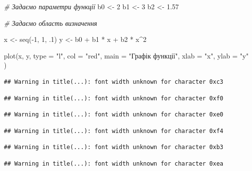 \documentclass[
]{book}
\newenvironment{Shaded}{\begin{snugshade}}{\end{snugshade}}
\newcommand{\AttributeTok}[1]{\textcolor[rgb]{0.77,0.63,0.00}{#1}}
\newcommand{\CommentTok}[1]{\textcolor[rgb]{0.56,0.35,0.01}{\textit{#1}}}
\newcommand{\DecValTok}[1]{\textcolor[rgb]{0.00,0.00,0.81}{#1}}
\newcommand{\FloatTok}[1]{\textcolor[rgb]{0.00,0.00,0.81}{#1}}
\newcommand{\FunctionTok}[1]{\textcolor[rgb]{0.00,0.00,0.00}{#1}}
\newcommand{\NormalTok}[1]{#1}
\newcommand{\OtherTok}[1]{\textcolor[rgb]{0.56,0.35,0.01}{#1}}
\newcommand{\SpecialCharTok}[1]{\textcolor[rgb]{0.00,0.00,0.00}{#1}}
\newcommand{\StringTok}[1]{\textcolor[rgb]{0.31,0.60,0.02}{#1}}
\begin{document}
\begin{Shaded}
\begin{Highlighting}[]
\CommentTok{\# Задаємо параметри функції}
\NormalTok{b0 }\OtherTok{\textless{}{-}} \DecValTok{2}
\NormalTok{b1 }\OtherTok{\textless{}{-}} \DecValTok{3}
\NormalTok{b2 }\OtherTok{\textless{}{-}} \FloatTok{1.57}

\CommentTok{\# Задаємо область визначення}

\NormalTok{x }\OtherTok{\textless{}{-}} \FunctionTok{seq}\NormalTok{(}\SpecialCharTok{{-}}\DecValTok{1}\NormalTok{, }\DecValTok{1}\NormalTok{, .}\DecValTok{1}\NormalTok{)}
\NormalTok{y }\OtherTok{\textless{}{-}}\NormalTok{ b0 }\SpecialCharTok{+}\NormalTok{ b1 }\SpecialCharTok{*}\NormalTok{ x }\SpecialCharTok{+}\NormalTok{ b2 }\SpecialCharTok{*}\NormalTok{ x}\SpecialCharTok{\^{}}\DecValTok{2}

\FunctionTok{plot}\NormalTok{(x, y,}
     \AttributeTok{type =} \StringTok{"l"}\NormalTok{,}
     \AttributeTok{col =} \StringTok{"red"}\NormalTok{,}
     \AttributeTok{main =} \StringTok{"Графік функції"}\NormalTok{,}
     \AttributeTok{xlab =} \StringTok{"x"}\NormalTok{,}
     \AttributeTok{ylab =} \StringTok{"y"}
\NormalTok{     )}
\end{Highlighting}
\end{Shaded}

\begin{verbatim}
## Warning in title(...): font width unknown for character 0xc3
\end{verbatim}

\begin{verbatim}
## Warning in title(...): font width unknown for character 0xf0
\end{verbatim}

\begin{verbatim}
## Warning in title(...): font width unknown for character 0xe0
\end{verbatim}

\begin{verbatim}
## Warning in title(...): font width unknown for character 0xf4
\end{verbatim}

\begin{verbatim}
## Warning in title(...): font width unknown for character 0xb3
\end{verbatim}

\begin{verbatim}
## Warning in title(...): font width unknown for character 0xea
\end{verbatim}
\end{document}
